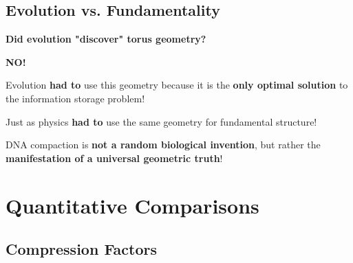 	\subsection{Evolution vs. Fundamentality}
	
	\begin{revolutionary}
		\textbf{Did evolution "discover" torus geometry?}
		
		\vspace{0.3cm}
		
		\textbf{NO!}
		
		\vspace{0.3cm}
		
		Evolution \textbf{had to} use this geometry because it is the \textbf{only optimal solution} to the information storage problem!
		
		\vspace{0.3cm}
		
		Just as physics \textbf{had to} use the same geometry for fundamental structure!
		
		\vspace{0.3cm}
		
		DNA compaction is \textbf{not a random biological invention}, but rather the \textbf{manifestation of a universal geometric truth}!
	\end{revolutionary}
	
	\section{Quantitative Comparisons}
	
	\subsection{Compression Factors}
	
	\begin{table}[H]
		\centering
		\caption{Compression factors}
	\end{table}
	
